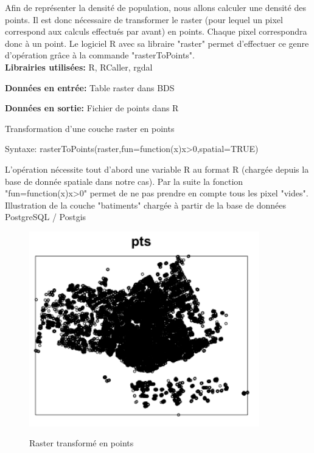 Afin de représenter la densité de population, nous allons calculer une densité des points. Il est donc nécessaire de transformer le raster (pour lequel un pixel correspond aux calculs effectués par avant) en points. Chaque pixel correspondra donc à un point. Le logiciel R avec sa libraire "raster" permet d'effectuer ce genre d'opération grâce à la commande "rasterToPoints".\\

\textbf{Librairies utilisées:} R, RCaller, rgdal 

\textbf{Données en entrée:}  Table raster dans BDS

\textbf{Données en sortie:} Fichier de points dans R\\

\begin{algorithm}[H]
\caption{\label{traitementpoints} Transformation d'une couche raster en points}
Syntaxe:
rasterToPoints(raster,fun=function(x){x>0},spatial=TRUE) \\
\end{algorithm}

L'opération nécessite tout d'abord une variable R au format R (chargée depuis la base de donnée spatiale dans notre cas). Par la suite la fonction "fun=function(x){x>0}" permet de ne pas prendre en compte tous les pixel "vides". \\

Illustration de la couche "batiments" chargée à partir de la base de données PostgreSQL / Postgis

\begin{center}
\begin{figure}[h] \centering
\includegraphics[width=10cm]{pointsbati2}\\
\caption{\label{poitsbati} Raster transformé en points}
\end{figure}
\end{center}

